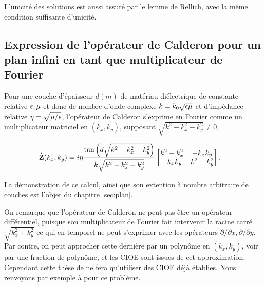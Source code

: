     L'unicité des solutions est aussi assuré par le lemme de Rellich, avec la même condition suffisante d'unicité.

    \subsection{Expression de l'opérateur de Calderon pour un plan infini en tant que multiplicateur de Fourier}


        Pour une couche d'épaisseur \(d (m)\) de matériau diélectrique de constante relative \(\epsilon,\mu\) et donc de nombre d'onde complexe \(k = k_0\sqrt{\epsilon\mu}\) et d'impédance relative \(\eta=\sqrt{{\mu}/{\epsilon}}\), l'opérateur de Calderon s'exprime en Fourier comme un multiplicateur matriciel en \((k_x,k_y)\), supposant \(\sqrt{k^2-k_x^2-k_y^2}\not=0\),

        \begin{align*}
          \hat {\mathbf{Z}}(k_x,k_y) &= i\eta\dfrac{\tan\left(d\sqrt{k^2-k_x^2-k_y^2}\right)}{k \sqrt{k^2-k_x^2-k_y^2}}
          \begin{bmatrix}
            k^2-k_x^2  & -k_xk_y
            \\
            -k_xk_y & k^2-k_y^2
          \end{bmatrix}.
        \end{align*}

        La démonstration de ce calcul, ainsi que son extention à nombre arbitraire de couches est l'objet du chapitre \ref{sec:plan}.

        On remarque que l'opérateur de Calderon ne peut pas être un opérateur différentiel, puisque son multiplicateur de Fourier fait intervenir la racine carré \(\sqrt{k_x^2 + k_y^2}\) ce qui en temporel ne peut s'exprimer avec les opérateurs \(\partial/\partial x, \partial / \partial y\).
        Par contre, on peut approcher cette dernière par un polynôme en \((k_x,k_y)\), voir par une fraction de polynôme, et les CIOE sont issues de cet approximation.
        Cependant cette thèse de ne fera qu'utiliser des CIOE déjà établies.
        Nous renvoyons par exemple à \cite{senior_approximate_1995} pour ce problème.


